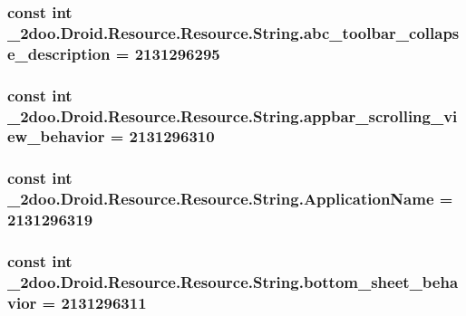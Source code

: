\hypertarget{class__2doo_1_1_droid_1_1_resource_1_1_string_99a3a21e774094f6288de5a2624592d9}{
\subsubsection[{abc\_\-toolbar\_\-collapse\_\-description}]{\setlength{\rightskip}{0pt plus 5cm}const int \_\-2doo.Droid.Resource.Resource.String.abc\_\-toolbar\_\-collapse\_\-description = 2131296295}}
\label{class__2doo_1_1_droid_1_1_resource_1_1_string_99a3a21e774094f6288de5a2624592d9}


\hypertarget{class__2doo_1_1_droid_1_1_resource_1_1_string_8a2f67392b5b054e43f6a25914f5cb8e}{
\subsubsection[{appbar\_\-scrolling\_\-view\_\-behavior}]{\setlength{\rightskip}{0pt plus 5cm}const int \_\-2doo.Droid.Resource.Resource.String.appbar\_\-scrolling\_\-view\_\-behavior = 2131296310}}
\label{class__2doo_1_1_droid_1_1_resource_1_1_string_8a2f67392b5b054e43f6a25914f5cb8e}


\hypertarget{class__2doo_1_1_droid_1_1_resource_1_1_string_53848ea73789ceb2b79ba424a6470279}{
\subsubsection[{ApplicationName}]{\setlength{\rightskip}{0pt plus 5cm}const int \_\-2doo.Droid.Resource.Resource.String.ApplicationName = 2131296319}}
\label{class__2doo_1_1_droid_1_1_resource_1_1_string_53848ea73789ceb2b79ba424a6470279}


\hypertarget{class__2doo_1_1_droid_1_1_resource_1_1_string_6d8964764d203b36494a1e181f357091}{
\subsubsection[{bottom\_\-sheet\_\-behavior}]{\setlength{\rightskip}{0pt plus 5cm}const int \_\-2doo.Droid.Resource.Resource.String.bottom\_\-sheet\_\-behavior = 2131296311}}
\label{class__2doo_1_1_droid_1_1_resource_1_1_string_6d8964764d203b36494a1e181f357091}


